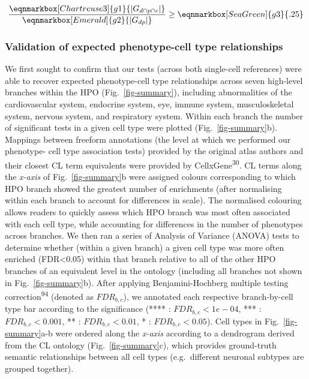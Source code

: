 \documentclass[
]{article}
\begin{document}
\hfill\break

\begin{equation*}
  \frac{
     \eqnmarkbox[Chartreuse3]{g1}{|G_{d \cap p \cap c} |}
    }{
       \eqnmarkbox[Emerald]{g2}{|G_{dp}|}} 
  \geq \eqnmarkbox[SeaGreen]{g3}{.25} 
\end{equation*}

\hfill\break
\hfill\break

\subsubsection{Validation of expected phenotype-cell type
relationships}\label{validation-of-expected-phenotype-cell-type-relationships-1}

We first sought to confirm that our tests (across both single-cell
references) were able to recover expected phenotype-cell type
relationships across seven high-level branches within the HPO
(Fig.~\ref{fig-summary}), including abnormalities of the cardiovascular
system, endocrine system, eye, immune system, musculoskeletal system,
nervous system, and respiratory system. Within each branch the number of
significant tests in a given cell type were plotted
(Fig.~\ref{fig-summary}b). Mappings between freeform annotations (the
level at which we performed our phenotype- cell type association tests)
provided by the original atlas authors and their closest CL term
equivalents were provided by CellxGene\textsuperscript{30}. CL terms
along the \emph{x-axis} of Fig.~\ref{fig-summary}b were assigned colours
corresponding to which HPO branch showed the greatest number of
enrichments (after normalising within each branch to account for
differences in scale). The normalised colouring allows readers to
quickly assess which HPO branch was most often associated with each cell
type, while accounting for differences in the number of phenotypes
across branches. We then ran a series of Analysis of Variance (ANOVA)
tests to determine whether (within a given branch) a given cell type was
more often enriched (FDR\textless0.05) within that branch relative to
all of the other HPO branches of an equivalent level in the ontology
(including all branches not shown in Fig.~\ref{fig-summary}b). After
applying Benjamini-Hochberg multiple testing
correction\textsuperscript{94} (denoted as \(FDR _{b,c}\)), we annotated
each respective branch-by-cell type bar according to the significance
(**** : \(FDR _{b,c}<1e-04\), *** : \(FDR _{b,c}<0.001\), ** :
\(FDR _{b,c}<0.01\), * : \(FDR _{b,c}<0.05\)). Cell types in
Fig.~\ref{fig-summary}a-b were ordered along the \emph{x-axis} according
to a dendrogram derived from the CL ontology (Fig.~\ref{fig-summary}c),
which provides ground-truth semantic relationships between all cell
types (e.g.~different neuronal subtypes are grouped together).
\end{document}
